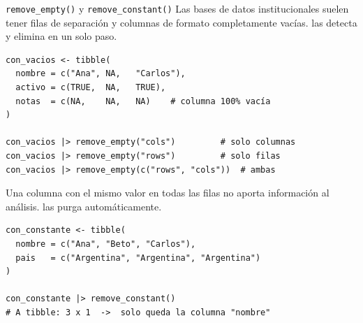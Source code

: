 \documentclass[8pt]{beamer}
\begin{document}
	\begin{frame}[fragile]{\texttt{remove\_empty()} y \texttt{remove\_constant()}}
		Las bases de datos institucionales suelen tener filas de separación y columnas de formato completamente vacías.  las detecta y elimina en un solo paso.

\begin{lstlisting}[style=RScript]
con_vacios <- tibble(
  nombre = c("Ana", NA,   "Carlos"),
  activo = c(TRUE,  NA,   TRUE),
  notas  = c(NA,    NA,   NA)    # columna 100% vacía
)

con_vacios |> remove_empty("cols")         # solo columnas
con_vacios |> remove_empty("rows")         # solo filas
con_vacios |> remove_empty(c("rows", "cols"))  # ambas
\end{lstlisting}

		Una columna con el mismo valor en todas las filas no aporta información al análisis.  las purga automáticamente.

\begin{lstlisting}[style=RScript]
con_constante <- tibble(
  nombre = c("Ana", "Beto", "Carlos"),
  pais   = c("Argentina", "Argentina", "Argentina")
)

con_constante |> remove_constant()
# A tibble: 3 x 1  ->  solo queda la columna "nombre"
\end{lstlisting}
	\end{frame}
\end{document}
